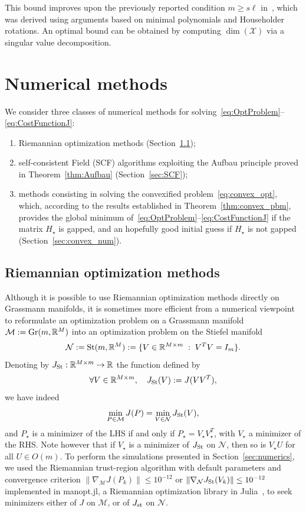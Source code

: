 \documentclass{article}
\def\R{\mathbb R}
\newcommand{\1}{{\mathds 1}}
\begin{document}
This bound improves upon the previously reported condition
$m \ge s\ell$ in~\cite{Marecat2023,Cernatic2024},
which was derived using arguments based on minimal polynomials and
Householder rotations.
An optimal bound can be obtained by computing
$\dim(\mathcal X)$ via a singular value decomposition.



\section{Numerical methods}
\label{sec:numerical_methods}

We consider three classes of numerical methods for solving~\eqref{eq:OptProblem}--\eqref{eq:CostFunctionJ}:
\begin{enumerate}
\item Riemannian optimization methods (Section~\ref{sec:RiemanniansOptimization});
\item self-consistent Field (SCF) algorithms exploiting the Aufbau principle proved in Theorem~\ref{thm:Aufbau} (Section~\ref{sec:SCF});
\item methods consisting in solving the convexified problem~\eqref{eq:convex_opt}, which, according to the results established in Theorem~\ref{thm:convex_pbm}, provides the global minimum of~\eqref{eq:OptProblem}--\eqref{eq:CostFunctionJ} if the matrix $H_\star$ is gapped, and an hopefully good initial guess if $H_\star$ is not gapped (Section~\ref{sec:convex_num}).
\end{enumerate}

\subsection{Riemannian optimization methods}
\label{sec:RiemanniansOptimization}

Although it is possible to use Riemannian optimization methods directly on Grassmann manifolds, it is sometimes more efficient from a numerical viewpoint to reformulate an optimization problem on a Grassmann manifold $\mathcal M:={\rm Gr}(m,\R^M)$ into an optimization problem on the Stiefel manifold 
$$
\mathcal N:={\rm St}(m,\R^M) := \{V \in \mathbb{R}^{M \times m} \; : \;  V^T V = I_{m}\}.
$$ 
Denoting by $J_{\rm St}: \mathbb{R}^{M \times m} \to \R$ the function defined by
$$
\forall V \in \R^{M \times m}, \quad J_{\rm St}(V) := J(VV^T),
$$
we have indeed
$$
\min_{P \in \mathcal M} J(P) = \min_{V \in \mathcal N} J_{\rm St}(V),
$$
and $P_\star$ is a minimizer of the LHS if and only if $P_\star=V_\star V_\star^T$, with $V_\star$ a minimizer of the RHS. Note however that if $V_\star$ is a minimizer of $J_{\rm St}$ on $\mathcal N$, then so is $V_\star U$ for all $U \in O(m)$. To perform the simulations presented in Section~\ref{sec:numerics}, we used the Riemannian trust-region algorithm with default parameters and convergence criterion $\|\nabla_{\mathcal M}J(P_k)\| \le 10^{-12}$  or $\|\nabla_{\mathcal N}J_{\rm St}(V_k)\| \le 10^{-12}$ implemented in manopt.jl, a Riemannian optimization library in Julia~\cite{Bergmann2022}, to seek minimizers either of $J$ on $\mathcal M$, or of $J_{\rm st}$ on $\mathcal N$. 
\end{document}
